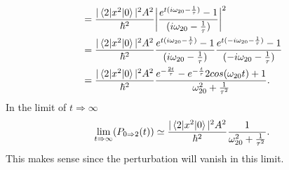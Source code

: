 \begin{example}
\begin{equation}
\begin{split}
			&=\frac{|\braket{2|x^2|0}|^2A^2}{\hbar^2}\bigg|\frac{e^{t(i\omega_{20}-\frac{1}{\tau})}-1}{(i\omega_{20}-\frac{1}{\tau})}\bigg|^2\\
			&=\frac{|\braket{2|x^2|0}|^2A^2}{\hbar^2}\frac{e^{t(i\omega_{20}-\frac{1}{\tau})}-1}{(i\omega_{20}-\frac{1}{\tau})}\frac{e^{t(-i\omega_{20}-\frac{1}{\tau})}-1}{(-i\omega_{20}-\frac{1}{\tau})}\\
			&=\frac{|\braket{2|x^2|0}|^2A^2}{\hbar^2}\frac{e^{-\frac{2t}{\tau}}-e^{-\frac{t}{\tau}}2cos(\omega_{20}t)+1}{\omega_{20}^2+\frac{1}{\tau^2}}.\\
		\end{split}
	\end{equation} 
	In the limit of $t\Rightarrow \infty$
	\begin{equation}
		\lim\limits_{t\Rightarrow\infty}(P_{0\Rightarrow 2}(t))\simeq\frac{|\braket{2|x^2|0}|^2A^2}{\hbar^2}\frac{1}{\omega_{20}^2+\frac{1}{\tau^2}}.
	\end{equation} 
	This makes sense since the perturbation will vanish in this limit.
\end{example}


